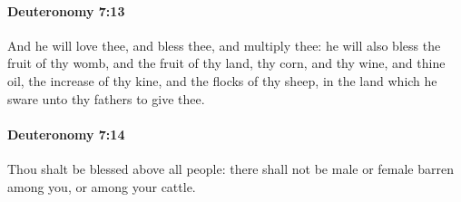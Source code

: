 		\paragraph{Deuteronomy 7:13} %
			\label{DEUTERONOMY-7-13}

			And he will love thee, and bless thee, and multiply thee: he will also bless the fruit of thy womb, and the fruit of thy land, thy corn, and thy wine, and thine oil, the increase of thy kine, and the flocks of thy sheep, in the land which he sware unto thy fathers to give thee.


		\paragraph{Deuteronomy 7:14} %
			\label{DEUTERONOMY-7-14}

			Thou shalt be blessed above all people: there shall not be male or female barren among you, or among your cattle.

